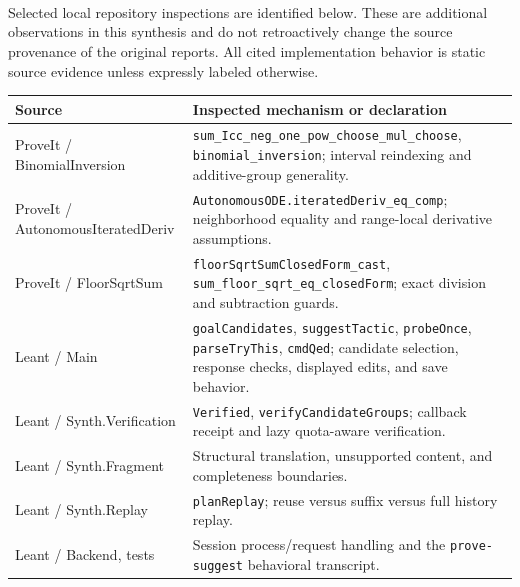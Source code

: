 \documentclass[11pt,letterpaper]{article}
\newcommand{\code}[1]{\nolinkurl{#1}}
\begin{document}
\begin{flushleft}\small\ttfamily
{}\\
\\
\\
\\
\\
\\
\\
\\
\end{flushleft}

Selected local repository inspections are identified below. These are additional
observations in this synthesis and do not retroactively change the source
provenance of the original reports. All cited implementation behavior is static
source evidence unless expressly labeled otherwise.

\begin{longtable}{@{}P{.31\textwidth}P{.61\textwidth}@{}}
\toprule
Source & Inspected mechanism or declaration \\
\midrule
\endhead
ProveIt / BinomialInversion & \code{sum_Icc_neg_one_pow_choose_mul_choose},
  \code{binomial_inversion}; interval reindexing and additive-group generality.\\
ProveIt / AutonomousIteratedDeriv & \code{AutonomousODE.iteratedDeriv_eq_comp};
  neighborhood equality and range-local derivative assumptions.\\
ProveIt / FloorSqrtSum & \code{floorSqrtSumClosedForm_cast},
  \code{sum_floor_sqrt_eq_closedForm}; exact division and subtraction guards.\\
Leant / Main & \code{goalCandidates}, \code{suggestTactic}, \code{probeOnce},
  \code{parseTryThis}, \code{cmdQed}; candidate selection, response checks,
  displayed edits, and save behavior.\\
Leant / Synth.Verification & \code{Verified}, \code{verifyCandidateGroups}; callback
  receipt and lazy quota-aware verification.\\
Leant / Synth.Fragment & Structural translation, unsupported content, and
  completeness boundaries.\\
Leant / Synth.Replay & \code{planReplay}; reuse versus suffix versus full history replay.\\
Leant / Backend, tests & Session process/request handling and the
  \code{prove-suggest} behavioral transcript.\\
\bottomrule
\end{longtable}
\end{document}
